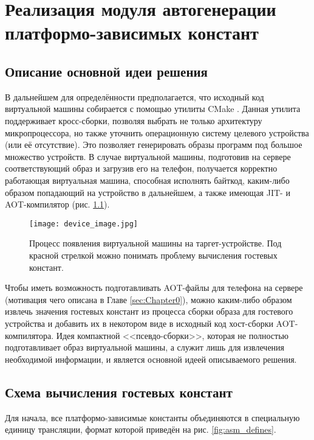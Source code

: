 \chapter[Реализация модуля]{Реализация модуля автогенерации платформо-зависимых констант}
\label{sec:Chapter3} 

\section{Описание основной идеи решения}
В дальнейшем для определённости предполагается, что исходный код виртуальной машины собирается с помощью утилиты CMake \cite{cmake}.
Данная утилита поддерживает кросс-сборки, позволяя выбрать не только архитектуру микропроцессора, но также уточнить операционную систему целевого устройства (или её отсутствие).
Это позволяет генерировать образы программ под большое множество устройств.
В случае виртуальной машины, подготовив на сервере соответствующий образ и загрузив его на телефон, получается корректно работающая виртуальная машина, способная исполнять байткод, каким-либо образом попадающий на устройство в дальнейшем, а также имеющая JIT- и AOT-компилятор (рис. \ref{fig:device_image}).

\begin{figure}[H]
    \centering
    \texttt{[image: device\_image.jpg]}
    \caption{Процесс появления виртуальной машины на таргет-устройстве. Под красной стрелкой можно понимать проблему вычисления гостевых констант.}
    \label{fig:device_image}
\end{figure}

Чтобы иметь возможность подготавливать AOT-файлы для телефона на сервере (мотивация чего описана в Главе \ref{sec:Chapter0}), можно каким-либо образом извлечь значения гостевых констант из процесса сборки образа для гостевого устройства и добавить их в некотором виде в исходный код хост-сборки AOT-компилятора.
Идея компактной <<псевдо-сборки>>, которая не полностью подготавливает образ виртуальной машины, а служит лишь для извлечения необходимой информации, и является основной идеей описываемого решения.

\section{Схема вычисления гостевых констант}
Для начала, все платформо-зависимые константы объединяются в специальную единицу трансляции, формат которой приведён на рис. \ref{fig:asm_defines}.

